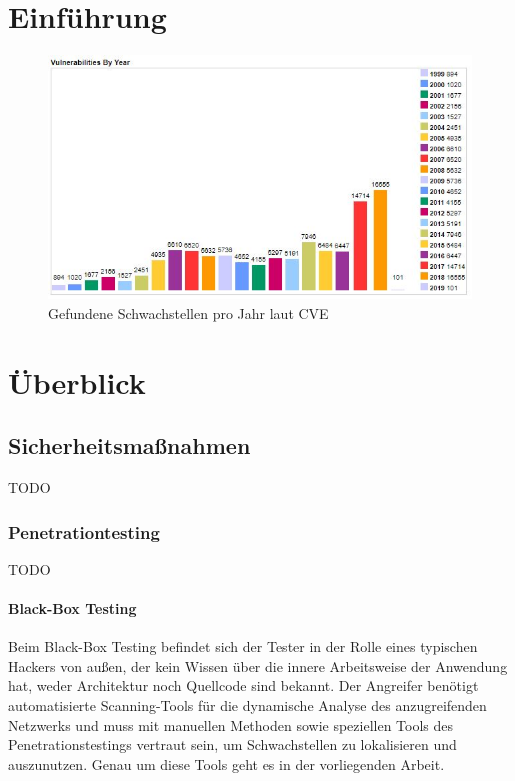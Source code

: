 \documentclass[12pt,oneside,a4paper,parskip]{scrbook}
\begin{document}
\chapter{Einführung}\label{ch:intro}

  \begin{figure}
    \includegraphics[width=1\textwidth]{VulnByYear}
    \caption[Gefundene Schwachstellen pro Jahr laut CVE]{Gefundene Schwachstellen pro Jahr laut CVE \cite{cve}}
  \end{figure}

\chapter{Überblick}
  \section{Sicherheitsmaßnahmen}
  TODO
    \subsection{Penetrationtesting}
    TODO

    \subsubsection{Black-Box Testing}
    Beim Black-Box Testing befindet sich der Tester in der Rolle eines typischen Hackers von
    außen, der kein Wissen über die innere Arbeitsweise der Anwendung hat, weder Architektur noch
    Quellcode sind bekannt. Der Angreifer benötigt automatisierte Scanning-Tools für die
    dynamische Analyse des anzugreifenden Netzwerks und muss mit manuellen Methoden sowie speziellen Tools des Penetrationstestings vertraut sein, um Schwachstellen zu lokalisieren und auszunutzen.
    Genau um diese Tools geht es in der vorliegenden Arbeit.
\end{document}

